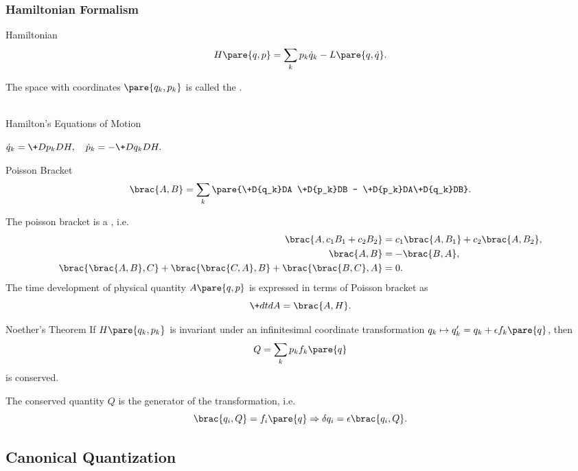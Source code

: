 \documentclass[hidelinks]{article}
\begin{document}

\subsubsection{Hamiltonian Formalism} %
\label{ssub:hamiltonian_formalism}

\begin{termdef}{Hamiltonian}
    \[ H\pare{q,p} = \sum_k p_k \dot{q}_k - L\pare{q,\dot{q}}. \]
\end{termdef}
The space with coordinates $\pare{q_k, p_k}$ is called the .
\begin{finaleq}{\\Hamilton's Equations of Motion}
    \centerline{$\displaystyle \dot{q}_k = \+D{p_k}DH,\quad \dot{p}_k = -\+D{q_k}DH.$}
\end{finaleq}
\begin{termdef}{Poisson Bracket}
    \[ \brac{A,B} = \sum_k \pare{\+D{q_k}DA \+D{p_k}DB - \+D{p_k}DA\+D{q_k}DB}. \]
\end{termdef}
The poisson bracket is a , i.e.
\begin{align*}
    \brac{A,c_1B_1 + c_2B_2} &= c_1\brac{A,B_1} + c_2\brac{A,B_2}, \\
    \brac{A,B} &= -\brac{B,A}, \\
    \brac{\brac{A,B},C} + \brac{\brac{C,A},B} + \brac{\brac{B,C},A} &= 0.
\end{align*}
The time development of physical quantity $A\pare{q,p}$ is expressed in terms of Poisson bracket as
\[ \+dtdA = \brac{A,H}. \]
\begin{finaleq}{Noether's Theorem}
    If $H\pare{q_k,p_k}$ is invariant under an infinitesimal coordinate transformation $q_k \mapsto q'_k = q_k + \epsilon f_k\pare{q}$, then
    \[ Q = \sum_k p_k f_k\pare{q} \]
    is conserved.
\end{finaleq}
The conserved quantity $Q$ is the generator of the transformation, i.e.
\[ \brac{q_i,Q} = f_i\pare{q} \Rightarrow \delta q_i = \epsilon\brac{q_i,Q}. \]



\subsection{Canonical Quantization} %
\label{sub:canonical_quantization}
\end{document}
